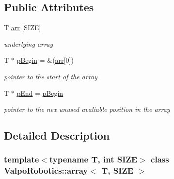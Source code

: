 \subsection*{Public Attributes}
\begin{DoxyCompactItemize}
\item 
\mbox{\label{class_valpo_robotics_1_1array_a7769453fad25835d0cf35f577bc62faa}} 
T \mbox{\hyperlink{class_valpo_robotics_1_1array_a7769453fad25835d0cf35f577bc62faa}{arr}} \mbox{[}S\+I\+ZE\mbox{]}
\begin{DoxyCompactList}\small\item\em underlying array \end{DoxyCompactList}\item 
\mbox{\label{class_valpo_robotics_1_1array_a31464f62e42309a1ef2476910cade587}} 
T $\ast$ \mbox{\hyperlink{class_valpo_robotics_1_1array_a31464f62e42309a1ef2476910cade587}{p\+Begin}} = \&(\mbox{\hyperlink{class_valpo_robotics_1_1array_a7769453fad25835d0cf35f577bc62faa}{arr}}\mbox{[}0\mbox{]})
\begin{DoxyCompactList}\small\item\em pointer to the start of the array \end{DoxyCompactList}\item 
\mbox{\label{class_valpo_robotics_1_1array_a63deade950411259aa7a55a80b672cdf}} 
T $\ast$ \mbox{\hyperlink{class_valpo_robotics_1_1array_a63deade950411259aa7a55a80b672cdf}{p\+End}} = \mbox{\hyperlink{class_valpo_robotics_1_1array_a31464f62e42309a1ef2476910cade587}{p\+Begin}}
\begin{DoxyCompactList}\small\item\em pointer to the nex unused avaliable position in the array \end{DoxyCompactList}\end{DoxyCompactItemize}


\subsection{Detailed Description}
\subsubsection*{template$<$typename T, int S\+I\+ZE$>$\newline
class Valpo\+Robotics\+::array$<$ T, S\+I\+Z\+E $>$}

